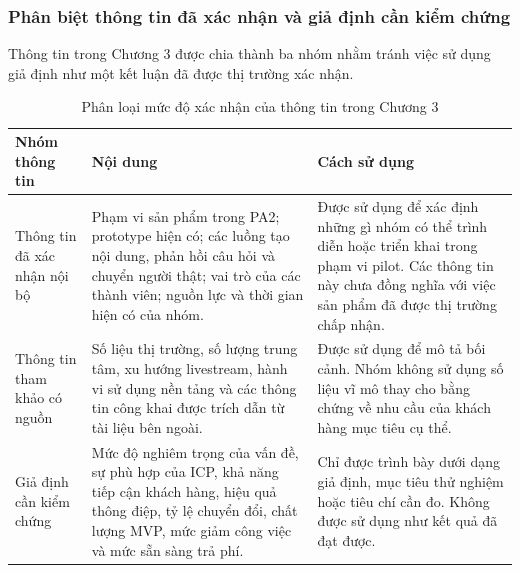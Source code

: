 \subsubsection{Phân biệt thông tin đã xác nhận và giả định cần kiểm chứng}

Thông tin trong Chương 3 được chia thành ba nhóm nhằm tránh việc sử dụng giả định như một kết luận đã được thị trường xác nhận.

\begin{table}[H]
    \centering
    \caption{Phân loại mức độ xác nhận của thông tin trong Chương 3}
    \label{tab:information-validation-level}
    \renewcommand{\arraystretch}{1.25}
    \begin{tabularx}{\textwidth}{
        p{}
        X
        X
    }
        \hline
        \textbf{Nhóm thông tin}
        & \textbf{Nội dung}
        & \textbf{Cách sử dụng} \\
        \hline

        Thông tin đã xác nhận nội bộ
        &
        Phạm vi sản phẩm trong PA2; prototype hiện có; các luồng tạo nội dung, phản hồi câu hỏi và chuyển người thật; vai trò của các thành viên; nguồn lực và thời gian hiện có của nhóm.
        &
        Được sử dụng để xác định những gì nhóm có thể trình diễn hoặc triển khai trong phạm vi pilot. Các thông tin này chưa đồng nghĩa với việc sản phẩm đã được thị trường chấp nhận. \\

        \hline

        Thông tin tham khảo có nguồn
        &
        Số liệu thị trường, số lượng trung tâm, xu hướng livestream, hành vi sử dụng nền tảng và các thông tin công khai được trích dẫn từ tài liệu bên ngoài.
        &
        Được sử dụng để mô tả bối cảnh. Nhóm không sử dụng số liệu vĩ mô thay cho bằng chứng về nhu cầu của khách hàng mục tiêu cụ thể. \\

        \hline

        Giả định cần kiểm chứng
        &
        Mức độ nghiêm trọng của vấn đề, sự phù hợp của ICP, khả năng tiếp cận khách hàng, hiệu quả thông điệp, tỷ lệ chuyển đổi, chất lượng MVP, mức giảm công việc và mức sẵn sàng trả phí.
        &
        Chỉ được trình bày dưới dạng giả định, mục tiêu thử nghiệm hoặc tiêu chí cần đo. Không được sử dụng như kết quả đã đạt được. \\

        \hline
    \end{tabularx}
\end{table}

